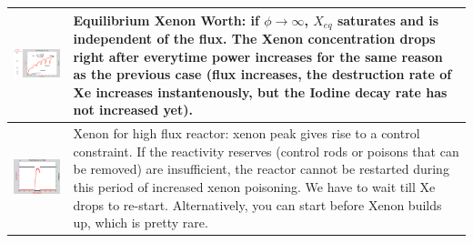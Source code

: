 \documentclass{school-22.211-notes}
\begin{document}
\begin{table}
\begin{tabular}{|p{}|p{}|}
%
    \begin{minipage}[b]{0.6\textwidth}
      \includegraphics[width=3.5in]{images/dfs/I-Xe-3.png}
    \end{minipage}
 &  
    \begin{minipage}[b]{0.4\textwidth}    
      Equilibrium Xenon Worth: if $\phi \to \infty$, $X_{eq}$ saturates and is independent of the flux. The Xenon concentration drops right after everytime power increases for the same reason as the previous case (flux increases, the destruction rate of Xe increases instantenously, but the Iodine decay rate has not increased yet). 
    \end{minipage} \\ \hline
%
    \begin{minipage}[b]{0.6\textwidth}
    \includegraphics[width=3.5in]{images/dfs/I-Xe-4.png}
    \end{minipage}
 &  
    \begin{minipage}[b]{0.4\textwidth}
      Xenon for high flux reactor: xenon peak gives rise to a control constraint. If the reactivity reserves (control rods or poisons that can be removed) are insufficient, the reactor cannot be restarted during this period of increased xenon poisoning. We have to wait till Xe drops to re-start. Alternatively, you can start before Xenon builds up, which is pretty rare. 
      \end{minipage} \\ \hline
  \end{tabular}
\end{table}
\end{document}
